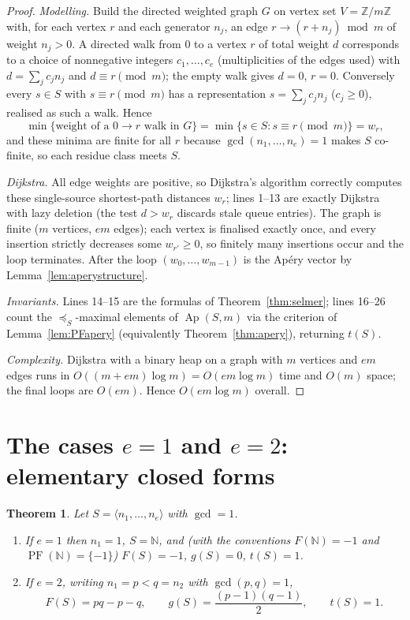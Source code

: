 \documentclass{amsart}
\newtheorem{theorem}{Theorem}
\theoremstyle{definition}
\DeclareMathOperator{\Ap}{Ap}
\DeclareMathOperator{\PF}{PF}
\newcommand{\NN}{\mathbb{N}}
\newcommand{\ZZ}{\mathbb{Z}}
\begin{document}
\begin{proof}
\emph{Modelling.} Build the directed weighted graph $G$ on vertex set
$V=\ZZ/m\ZZ$ with, for each vertex $r$ and each generator $n_j$, an edge
$r\to(r+n_j)\bmod m$ of weight $n_j>0$. A directed walk from $0$ to a
vertex $r$ of total weight $d$ corresponds to a choice of nonnegative
integers $c_1,\dots,c_e$ (multiplicities of the edges used) with
$d=\sum_j c_jn_j$ and $d\equiv r\pmod m$; the empty walk gives $d=0$,
$r=0$. Conversely every $s\in S$ with $s\equiv r\pmod m$ has a
representation $s=\sum_j c_jn_j$ ($c_j\ge0$), realised as such a walk.
Hence
\[
\min\{\text{weight of a }0\!\to\! r\text{ walk in }G\}
=\min\{s\in S:s\equiv r\pmod m\}=w_r,
\]
and these minima are finite for all $r$ because $\gcd(n_1,\dots,n_e)=1$
makes $S$ co-finite, so each residue class meets $S$.

\emph{Dijkstra.} All edge weights are positive, so Dijkstra's algorithm
correctly computes these single-source shortest-path distances $w_r$; lines
1--13 are exactly Dijkstra with lazy deletion (the test $d>w_r$ discards
stale queue entries). The graph is finite ($m$ vertices, $em$ edges); each
vertex is finalised exactly once, and every insertion strictly decreases
some $w_{r'}\ge0$, so finitely many insertions occur and the loop
terminates. After the loop $(w_0,\dots,w_{m-1})$ is the Ap\'ery vector by
Lemma~\ref{lem:aperystructure}.

\emph{Invariants.} Lines 14--15 are the formulas of
Theorem~\ref{thm:selmer}; lines 16--26 count the $\preceq_S$-maximal
elements of $\Ap(S,m)$ via the criterion of Lemma~\ref{lem:PFapery}
(equivalently Theorem~\ref{thm:apery}), returning $t(S)$.

\emph{Complexity.} Dijkstra with a binary heap on a graph with $m$ vertices
and $em$ edges runs in $O((m+em)\log m)=O(em\log m)$ time and $O(m)$ space;
the final loops are $O(em)$. Hence $O(em\log m)$ overall.
\end{proof}

\section{The cases $e=1$ and $e=2$: elementary closed forms}

\begin{theorem}\label{thm:e12}
Let $S=\langle n_1,\dots,n_e\rangle$ with $\gcd=1$.
\begin{enumerate}
\item[(a)] If $e=1$ then $n_1=1$, $S=\NN$, and (with the conventions
$F(\NN)=-1$ and $\PF(\NN)=\{-1\}$)
$F(S)=-1$, $g(S)=0$, $t(S)=1$.
\item[(b)] If $e=2$, writing $n_1=p<q=n_2$ with $\gcd(p,q)=1$,
\[
F(S)=pq-p-q,\qquad g(S)=\frac{(p-1)(q-1)}{2},\qquad t(S)=1.
\]
\end{enumerate}
\end{theorem}
\end{document}
